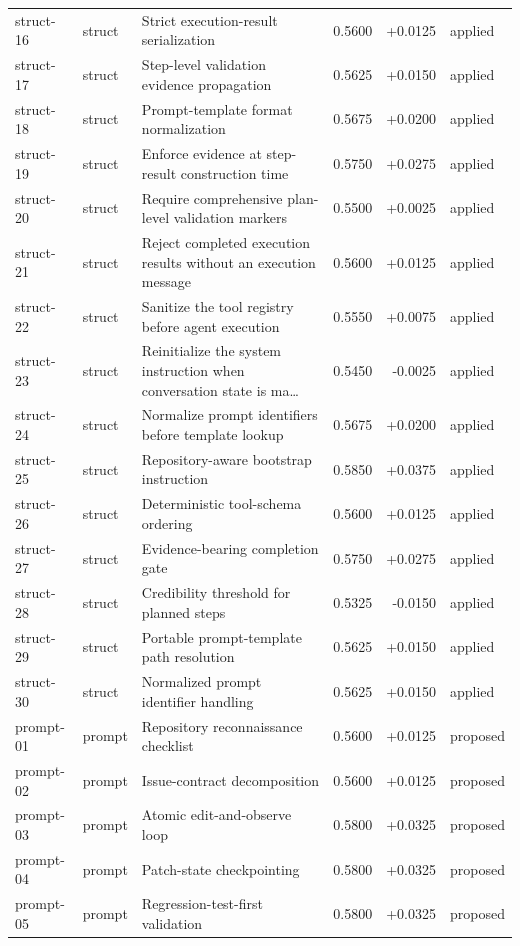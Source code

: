 \begin{center}
\begin{longtable}{llp{5.2cm}rrl}
struct-16 & struct & Strict execution-result serialization & 0.5600 & +0.0125 & applied \\
struct-17 & struct & Step-level validation evidence propagation & 0.5625 & +0.0150 & applied \\
struct-18 & struct & Prompt-template format normalization & 0.5675 & +0.0200 & applied \\
struct-19 & struct & Enforce evidence at step-result construction time & 0.5750 & +0.0275 & applied \\
struct-20 & struct & Require comprehensive plan-level validation markers & 0.5500 & +0.0025 & applied \\
struct-21 & struct & Reject completed execution results without an execution message & 0.5600 & +0.0125 & applied \\
struct-22 & struct & Sanitize the tool registry before agent execution & 0.5550 & +0.0075 & applied \\
struct-23 & struct & Reinitialize the system instruction when conversation state is ma\ldots{} & 0.5450 & -0.0025 & applied \\
struct-24 & struct & Normalize prompt identifiers before template lookup & 0.5675 & +0.0200 & applied \\
struct-25 & struct & Repository-aware bootstrap instruction & 0.5850 & +0.0375 & applied \\
struct-26 & struct & Deterministic tool-schema ordering & 0.5600 & +0.0125 & applied \\
struct-27 & struct & Evidence-bearing completion gate & 0.5750 & +0.0275 & applied \\
struct-28 & struct & Credibility threshold for planned steps & 0.5325 & -0.0150 & applied \\
struct-29 & struct & Portable prompt-template path resolution & 0.5625 & +0.0150 & applied \\
struct-30 & struct & Normalized prompt identifier handling & 0.5625 & +0.0150 & applied \\
prompt-01 & prompt & Repository reconnaissance checklist & 0.5600 & +0.0125 & proposed \\
prompt-02 & prompt & Issue-contract decomposition & 0.5600 & +0.0125 & proposed \\
prompt-03 & prompt & Atomic edit-and-observe loop & 0.5800 & +0.0325 & proposed \\
prompt-04 & prompt & Patch-state checkpointing & 0.5800 & +0.0325 & proposed \\
prompt-05 & prompt & Regression-test-first validation & 0.5800 & +0.0325 & proposed \\

\end{longtable}
\end{center}
